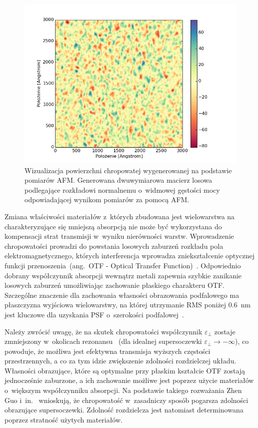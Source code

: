 \begin{figure}[bt]
		\includegraphics[width=\textwidth]{images/multilayer/ag30nm-afm-generated.png}
		\caption{Wizualizacja powierzchni chropowatej wygenerowanej na podstawie pomiarów AFM. Generowana dwuwymiarowa macierz losowa podlegające rozkładowi normalnemu o~widmowej gęstości mocy odpowiadającej wynikom pomiarów za pomocą AFM.} 
		\label{fig:ag30nm-afmgene}
\end{figure}


Zmiana właściwości materiałów z~których zbudowana jest wielowarstwa na charakteryzujące się mniejszą absorpcją nie może być wykorzystana do kompensacji strat transmisji w~wyniku nierówności warstw. Wprowadzenie chropowatości prowadzi do powstania losowych zaburzeń rozkładu pola elektromagnetycznego, których interferencja wprowadza zniekształcenie optycznej funkcji przenoszenia~(ang.~OTF - Optical Transfer Function)~\cite{citeulike:2926459}. Odpowiednio dobrany współczynnik absorpcji wewnątrz metali zapewnia szybkie zanikanie losowych zaburzeń umożliwiając zachowanie płaskiego charakteru OTF. Szczególne znaczenie dla zachowania własności obrazowania podfalowego ma płaszczyzna wyjściowa wielowarstwy, na której utrzymanie RMS poniżej $0.6$~nm jest kluczowe dla uzyskania PSF o~szerokości podfalowej~\cite{guo2014negative}.

Należy zwrócić uwagę, że na skutek chropowatości współczynnik $\varepsilon_{\perp}$ zostaje zmniejszony w~okolicach rezonansu~\cite{guo2014negative} (dla idealnej supersoczewki $\varepsilon_{\perp} \to - \infty$), co powoduje, że możliwa jest efektywna transmisja wyższych częstości przestrzennych, a co za tym idzie zwiększenie zdolności rozdzielczej układu. Własności obrazujące, które są optymalne przy płaskim kształcie OTF zostają jednocześnie zaburzone, a ich zachowanie możliwe jest poprzez użycie materiałów o~większym współczynniku absorpcji. Na podstawie takiego rozważania Zhen Guo i~in.~\cite{guo2014negative} wnioskują, że chropowatość w~zasadniczy sposób pogarsza zdolności obrazujące supersoczewki. Zdolność rozdzielcza jest natomiast determinowana poprzez stratność użytych materiałów.

